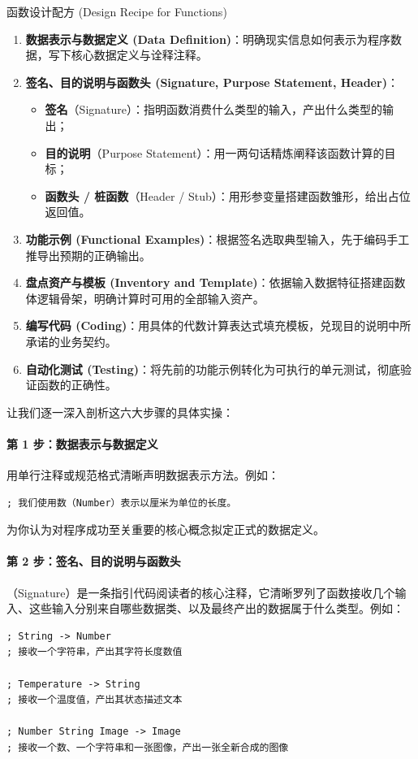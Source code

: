 \begin{recipebox}{函数设计配方 (Design Recipe for Functions)}
\begin{enumerate}
  \item \textbf{数据表示与数据定义 (Data Definition)}：明确现实信息如何表示为程序数据，写下核心数据定义与诠释注释。
  \item \textbf{签名、目的说明与函数头 (Signature, Purpose Statement, Header)}：
    \begin{itemize}
      \item \textbf{签名}（Signature）：指明函数消费什么类型的输入，产出什么类型的输出；
      \item \textbf{目的说明}（Purpose Statement）：用一两句话精炼阐释该函数计算的目标；
      \item \textbf{函数头 / 桩函数}（Header / Stub）：用形参变量搭建函数雏形，给出占位返回值。
    \end{itemize}
  \item \textbf{功能示例 (Functional Examples)}：根据签名选取典型输入，先于编码手工推导出预期的正确输出。
  \item \textbf{盘点资产与模板 (Inventory and Template)}：依据输入数据特征搭建函数体逻辑骨架，明确计算时可用的全部输入资产。
  \item \textbf{编写代码 (Coding)}：用具体的代数计算表达式填充模板，兑现目的说明中所承诺的业务契约。
  \item \textbf{自动化测试 (Testing)}：将先前的功能示例转化为可执行的单元测试，彻底验证函数的正确性。
\end{enumerate}
\end{recipebox}

让我们逐一深入剖析这六大步骤的具体实操：

\paragraph{第 1 步：数据表示与数据定义}
用单行注释或规范格式清晰声明数据表示方法。例如：
\begin{lstlisting}[language=BSL]
; 我们使用数（Number）表示以厘米为单位的长度。
\end{lstlisting}
为你认为对程序成功至关重要的核心概念拟定正式的数据定义。

\paragraph{第 2 步：签名、目的说明与函数头}
（Signature）是一条指引代码阅读者的核心注释，它清晰罗列了函数接收几个输入、这些输入分别来自哪些数据类、以及最终产出的数据属于什么类型。例如：
\begin{lstlisting}[language=BSL]
; String -> Number
; 接收一个字符串，产出其字符长度数值

; Temperature -> String
; 接收一个温度值，产出其状态描述文本

; Number String Image -> Image
; 接收一个数、一个字符串和一张图像，产出一张全新合成的图像
\end{lstlisting}

